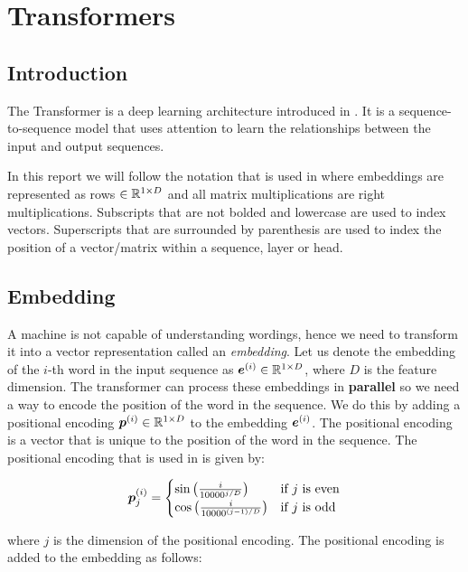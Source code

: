 \documentclass[main.tex]{subfiles}
\begin{document}
\section{Transformers}
\subsection{Introduction}

The Transformer is a deep learning architecture introduced in \cite{vaswani2017attention}. It is a sequence-to-sequence model that uses attention to learn the relationships between the input and output sequences.

In this report we will follow the notation that is used in \cite{vaswani2017attention} where embeddings are represented as rows $\in \mathbb{R}^{1 \times D}$ and all matrix multiplications are right multiplications. Subscripts that are not bolded and lowercase are used to index vectors. Superscripts that are surrounded by parenthesis are used to index the position of a vector/matrix within a sequence, layer or head. 

\subsection{Embedding}

A machine is not capable of understanding wordings, hence we need to transform it into a vector representation called an \emph{embedding}. Let us denote the embedding of the $i$-th word in the input sequence as $\bm{e}^{(i)} \in \mathbb{R}^{1 \times D}$, where $D$ is the feature dimension. The transformer can process these embeddings in \textbf{parallel} so we need a way to encode the position of the word in the sequence. We do this by adding a positional encoding $\bm{p}^{(i)} \in \mathbb{R}^{1 \times D}$ to the embedding $\bm{e}^{(i)}$. The positional encoding is a vector that is unique to the position of the word in the sequence. The positional encoding that is used in \cite{vaswani2017attention} is given by:

\begin{equation}
	\bm{p}_j^{(i)} = \begin{cases}
		\sin\left(\frac{i}{10000^{j/D}}\right) & \text{if } j \text{ is even} \\
		\cos\left(\frac{i}{10000^{(j-1)/D}}\right) & \text{if } j \text{ is odd}
	\end{cases}
\end{equation}

\noi where $j$ is the dimension of the positional encoding. The positional encoding is added to the embedding as follows:
\end{document}
